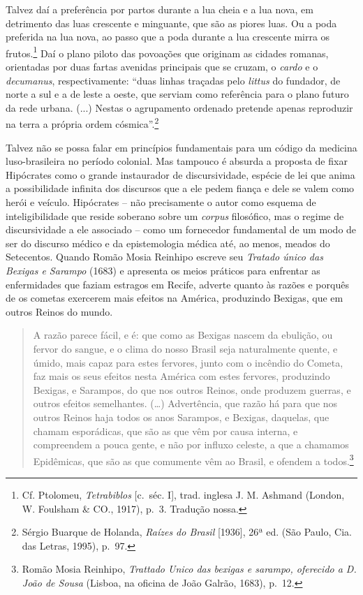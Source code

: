 Talvez daí a preferência por partos durante a lua cheia e a lua nova, em
detrimento das luas crescente e minguante, que são as piores luas. Ou a
poda preferida na lua nova, ao passo que a poda durante a lua crescente
mirra os frutos.\footnote{Cf. Ptolomeu, \emph{Tetrabiblos} {[}c.~séc.
  I{]}, trad. inglesa J. M. Ashmand (London, W. Foulsham \& CO., 1917),
  p.~3. Tradução nossa.} Daí o plano piloto das povoações que originam
as cidades romanas, orientadas por duas fartas avenidas principais que
se cruzam, o \emph{cardo} e o \emph{decumanus}, respectivamente: ``duas
linhas traçadas pelo \emph{littus} do fundador, de norte a sul e a de
leste a oeste, que serviam como referência para o plano futuro da rede
urbana. (...) Nestas o agrupamento ordenado pretende apenas reproduzir
na terra a própria ordem cósmica''.\footnote{Sérgio Buarque de Holanda,
  \emph{Raízes do Brasil} {[}1936{]}, 26ª ed. (São Paulo, Cia. das
  Letras, 1995), p.~97.}

Talvez não se possa falar em princípios fundamentais para um código da
medicina luso-brasileira no período colonial. Mas tampouco é absurda a
proposta de fixar Hipócrates como o grande instaurador de
discursividade, espécie de lei que anima a possibilidade infinita dos
discursos que a ele pedem fiança e dele se valem como herói e veículo.
Hipócrates -- não precisamente o autor como esquema de inteligibilidade
que reside soberano sobre um \emph{corpus} filosófico, mas o regime de
discursividade a ele associado -- como um fornecedor fundamental de um
modo de ser do discurso médico e da epistemologia médica até, ao menos,
meados do Setecentos. Quando Romão Mosia Reinhipo escreve seu
\emph{Tratado único das Bexigas e Sarampo} (1683) e apresenta os meios
práticos para enfrentar as enfermidades que faziam estragos em Recife,
adverte quanto às razões e porquês de os cometas exercerem mais efeitos
na América, produzindo Bexigas, que em outros Reinos do mundo.

\begin{quote}
A razão parece fácil, e é: que como as Bexigas nascem da ebulição, ou
fervor do sangue, e o clima do nosso Brasil seja naturalmente quente, e
úmido, mais capaz para estes fervores, junto com o incêndio do Cometa,
faz mais os seus efeitos nesta América com estes fervores, produzindo
Bexigas, e Sarampos, do que nos outros Reinos, onde produzem guerras, e
outros efeitos semelhantes. (\ldots{}) Advertência, que razão há para
que nos outros Reinos haja todos os anos Sarampos, e Bexigas, daquelas,
que chamam esporádicas, que são as que vêm por causa interna, e
compreendem a pouca gente, e não por influxo celeste, a que a chamamos
Epidêmicas, que são as que comumente vêm ao Brasil, e ofendem a
todos.\footnote{Romão Mosia Reinhipo, \emph{Trattado Unico das bexigas e
  sarampo, oferecido a D. João de Sousa} (Lisboa, na oficina de João
  Galrão, 1683), p.~12.}
\end{quote}

